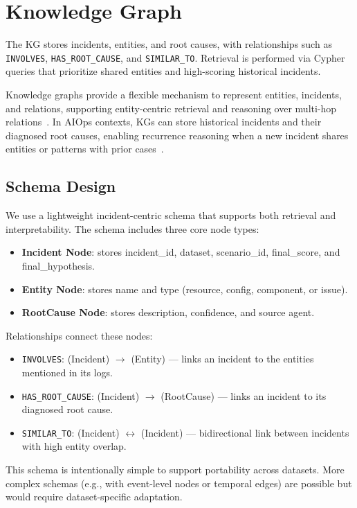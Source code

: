 \section{Knowledge Graph}
The KG stores incidents, entities, and root causes, with relationships such as \texttt{INVOLVES},
\texttt{HAS\_ROOT\_CAUSE}, and \texttt{SIMILAR\_TO}. Retrieval is performed via Cypher queries
that prioritize shared entities and high-scoring historical incidents.

Knowledge graphs provide a flexible mechanism to represent entities, incidents, and relations,
supporting entity-centric retrieval and reasoning over multi-hop
relations~\cite{hogan2021knowledge}. In AIOps contexts, KGs can store historical incidents and
their diagnosed root causes, enabling recurrence reasoning when a new incident shares entities or
patterns with prior cases~\cite{cui2025aetherlog}.

\subsection{Schema Design}
We use a lightweight incident-centric schema that supports both retrieval and interpretability.
The schema includes three core node types:
\begin{itemize}
  \item \textbf{Incident Node}: stores incident\_id, dataset, scenario\_id, final\_score, and
        final\_hypothesis.
  \item \textbf{Entity Node}: stores name and type (resource, config, component, or issue).
  \item \textbf{RootCause Node}: stores description, confidence, and source agent.
\end{itemize}

Relationships connect these nodes:
\begin{itemize}
  \item \texttt{INVOLVES}: (Incident) $\rightarrow$ (Entity) --- links an incident to the
        entities mentioned in its logs.
  \item \texttt{HAS\_ROOT\_CAUSE}: (Incident) $\rightarrow$ (RootCause) --- links an incident to
        its diagnosed root cause.
  \item \texttt{SIMILAR\_TO}: (Incident) $\leftrightarrow$ (Incident) --- bidirectional link
        between incidents with high entity overlap.
\end{itemize}

This schema is intentionally simple to support portability across datasets. More complex schemas
(e.g., with event-level nodes or temporal edges) are possible but would require dataset-specific
adaptation.

